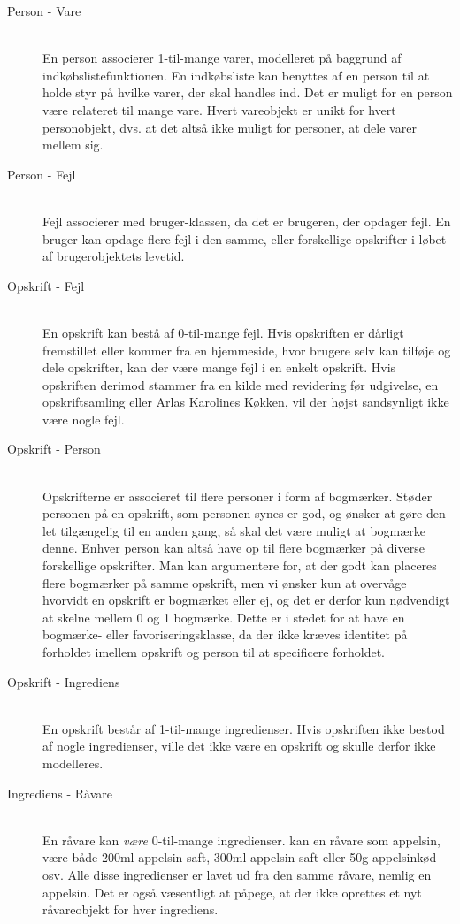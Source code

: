 \begin{description}

\item[Person - Vare] \hfill \\
En person associerer 1-til-mange varer, modelleret på baggrund af indkøbslistefunktionen. En indkøbsliste kan benyttes af en person til at holde styr på hvilke varer, der skal handles ind.  Det er muligt for en person være relateret til mange vare. Hvert vareobjekt er unikt for hvert personobjekt, dvs. at det altså ikke muligt for personer, at dele varer mellem sig.

\item[Person - Fejl] \hfill \\
Fejl associerer med bruger-klassen, da det er brugeren, der opdager fejl. En bruger kan opdage flere fejl i den samme, eller forskellige opskrifter i løbet af brugerobjektets levetid.

\item[Opskrift - Fejl] \hfill \\
En opskrift kan bestå af 0-til-mange fejl. Hvis opskriften er dårligt fremstillet eller kommer fra en hjemmeside, hvor brugere selv kan tilføje og dele opskrifter, kan der \fx være mange fejl i en enkelt opskrift. Hvis opskriften derimod stammer fra en kilde med revidering før udgivelse, \fx en opskriftsamling eller Arlas Karolines Køkken, vil der højst sandsynligt ikke være nogle fejl. 

\item[Opskrift - Person] \hfill \\
Opskrifterne er associeret til flere personer i form af bogmærker. Støder personen på en opskrift, som personen synes er god, og ønsker at gøre den let tilgængelig til en anden gang, så skal det være muligt at bogmærke denne. Enhver person kan altså have op til flere bogmærker på diverse forskellige opskrifter. Man kan argumentere for, at der godt kan placeres flere bogmærker på samme opskrift, men vi ønsker kun at overvåge hvorvidt en opskrift er bogmærket eller ej, og det er derfor kun nødvendigt at skelne mellem 0 og 1 bogmærke. Dette er i stedet for at have en bogmærke- eller favoriseringsklasse, da der ikke kræves identitet på forholdet imellem opskrift og person til at specificere forholdet.

\item[Opskrift - Ingrediens] \hfill \\
En opskrift består af 1-til-mange ingredienser. Hvis opskriften ikke bestod af nogle ingredienser, ville det ikke være en opskrift og skulle derfor ikke modelleres. 

\item[Ingrediens - Råvare] \hfill \\
En råvare kan \textit{være} 0-til-mange ingredienser. \Fx kan en råvare som appelsin, være både 200ml appelsin saft, 300ml appelsin saft eller 50g appelsinkød osv. Alle disse ingredienser er lavet ud fra den samme råvare, nemlig en appelsin. Det er også væsentligt at påpege, at der ikke oprettes et nyt råvareobjekt for hver ingrediens.

\end{description}


